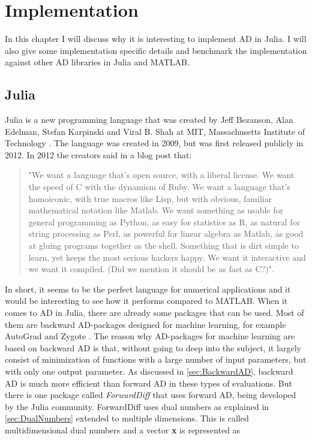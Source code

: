 \chapter{Implementation}
In this chapter I will discuss why it is interesting to implement AD in Julia. I will also give some implementation specific details and benchmark the implementation against other AD libraries in Julia and MATLAB.
\label{ch:Implementation}
\section{Julia}
\label{sec:Julia}
Julia is a new programming language that was created by Jeff Bezanson, Alan Edelman, Stefan Karpinski and Viral B. Shah at MIT, Massachusetts Institute of Technology \emph{\citep{juliaLab}}. The language was created in 2009, but was first released publicly in 2012. In 2012 the creators said in a blog post that:
\begin{quotation}
"We want a language that’s open source, with a liberal license. We want the speed of C with the dynamism of Ruby. We want a language that’s homoiconic, with true macros like Lisp, but with obvious, familiar mathematical notation like Matlab. We want something as usable for general programming as Python, as easy for statistics as R, as natural for string processing as Perl, as powerful for linear algebra as Matlab, as good at gluing programs together as the shell. Something that is dirt simple to learn, yet keeps the most serious hackers happy. We want it interactive and we want it compiled. (Did we mention it should be as fast as C?)"\emph{\citep{juliaBlogRelease2012}}.
\end{quotation}
In short, it seems to be the perfect language for numerical applications and it would be interesting to see how it performs compared to MATLAB. When it comes to AD in Julia, there are already some packages that can be used. Most of them are backward AD-packages designed for machine learning, for example AutoGrad \emph{\citep{knet2016mlsys}} and Zygote \emph{\citep{innes2018don}}. The reason why AD-packages for machine learning are based on backward AD is that, without going to deep into the subject, it largely consist of minimization of functions with a large number of input parameters, but with only one output parameter. As discussed in \autoref{sec:BackwardAD}, backward AD is much more efficient than forward AD in these types of evaluations. But there is one package called \textit{ForwardDiff} \emph{\citep{ForwardDiff}} that uses forward AD, being developed by the Julia community. ForwardDiff uses dual numbers as explained in \autoref{sec:DualNumbers} extended to multiple dimensions. This is called multidimensional dual numbers and a vector \textbf{x} is represented as

